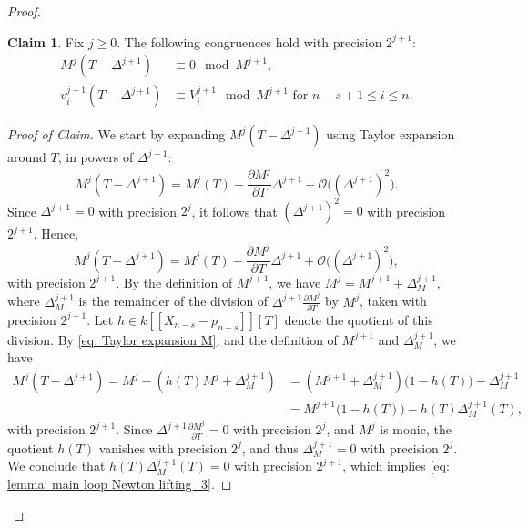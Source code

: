 \documentclass[pdflatex,sn-basic]{sn-jnl}%
\theoremstyle{thmstyleone}%
\theoremstyle{thmstyletwo}%
\theoremstyle{thmstylethree}%
\theoremstyle{definition}
\newtheorem*{claim}{Claim}
\numberwithin{equation}{section}
\begin{document}
\begin{proof}
\begin{claim} Fix $j\geq 0$. The following congruences hold with precision $2^{j+1}$:
 \begin{align}
 M^j(T-\Delta^{j+1})&\equiv 0 \mod M^{j+1},\label{eq: lemma: main loop Newton lifting_3}\\
 v^{j+1}_i(T-\Delta^{j+1})&\equiv V^{j+1}_i \mod M^{j+1} \textrm{ for }n-s+1\le i \le n.
 \label{eq: lemma: main loop Newton lifting_4}
 \end{align}
\end{claim}
%
\begin{proof}[Proof of Claim]
%
We start by expanding $M^j(T-\Delta^{j+1})$ using Taylor expansion
around $T$, in
powers of $\Delta^{j+1}$:
%
$$
M^j(T-\Delta^{j+1})=M^j(T)-\frac{\partial M^j}{\partial T}\Delta^{j+1}
+\mathcal{O}\big((\Delta^{j+1})^2\big).
$$
%
Since $\Delta^{j+1}=0$ with precision $2^{j}$, it follows that
$(\Delta^{j+1})^2=0$ with precision $2^{j+1}$. Hence,
%
\begin{equation}\label{eq: Taylor expansion M}
M^j(T-\Delta^{j+1})=M^j(T)-\frac{\partial M^j}{\partial T}\Delta^{j+1}
+\mathcal{O}\big((\Delta^{j+1})^2\big),
\end{equation}
%
with precision $2^{j+1}$. By the definition of $M^{j+1}$,
we have $M^j=M^{j+1}+\Delta^{j+1}_{M}$, where $\Delta^{j+1}_{M}$ is the
remainder of the division of $\Delta^{j+1}\frac{\partial
M^j}{\partial T}$ by $M^j$, taken with precision $2^{j+1}$. Let
$h\in k[\![X_{n-s}-p_{n-s}]\!][T]$ denote the quotient of this
division. By \eqref{eq: Taylor expansion M}, and the definition
of $M^{j+1}$ and $\Delta^{j+1}_{M}$, we have
%
\begin{align*}
M^j(T-\Delta^{j+1})=
M^j-(h(T)M^j+\Delta^{j+1}_{M})
&=
(M^{j+1}+\Delta^{j+1}_{M})\big(1-h(T)\big)-\Delta^{j+1}_{M}\\
&=M^{j+1}\big(1-h(T)\big)- h(T)\Delta^{j+1}_{M}(T),
\end{align*}
%
with precision $2^{j+1}$. Since $\Delta^{j+1}\frac{\partial
M^j}{\partial T}=0$ with precision $2^{j}$, and $M^j$ is monic,
the quotient $h(T)$ vanishes with precision $2^{j}$, and thus
$\Delta^{j+1}_{M}=0$ with precision $2^{j}$. We conclude that
$h(T)\Delta^{j+1}_{M}(T)=0$ with precision $2^{j+1}$, which implies
\eqref{eq: lemma: main loop Newton lifting_3}.


\end{proof}
\end{proof}
\end{document}
